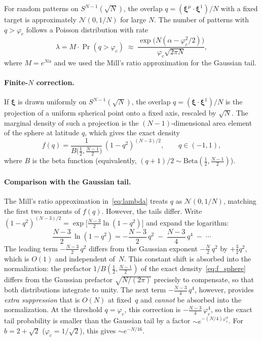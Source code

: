 \documentclass[11pt]{article}
\newcommand{\vp}{\varphi}
\newcommand{\bxi}{\boldsymbol{\xi}}
\begin{document}
For random patterns on $S^{N-1}(\sqrt{N})$, the overlap
$q = (\bxi^\mu \cdot \bxi^1)/N$ with a fixed target is
approximately $\mathcal{N}(0, 1/N)$ for large $N$.
The number of patterns with $q > \vp_c$ follows a Poisson
distribution with rate
\begin{equation}\label{eq:lambda}
  \lambda = M \cdot \Pr(q > \vp_c)
  \;\approx\;
  \frac{\exp\!\bigl(N(\alpha - \vp_c^2/2)\bigr)}
       {\vp_c \sqrt{2\pi N}},
\end{equation}
where $M = e^{N\alpha}$ and we used the Mill's ratio
approximation for the Gaussian tail.

\paragraph{Finite-$N$ correction.}
If $\bxi$ is drawn uniformly on $S^{N-1}(\sqrt{N})$,
the overlap $q = (\bxi \cdot \bxi^1)/N$ is
the projection of a uniform spherical point onto a fixed axis,
rescaled by $\sqrt{N}$.  The marginal density of such a
projection is the $(N{-}1)$-dimensional area element of the
sphere at latitude $q$, which gives the exact density
\begin{equation}\label{eq:f_sphere}
  f(q) = \frac{1}{B\!\bigl(\tfrac{1}{2}, \tfrac{N-1}{2}\bigr)}\,
  (1 - q^2)^{(N-3)/2}, \qquad q \in (-1, 1),
\end{equation}
where $B$ is the beta function
(equivalently, $(q+1)/2 \sim \mathrm{Beta}(\tfrac{1}{2},\tfrac{N-1}{2})$).

\paragraph{Comparison with the Gaussian tail.}
The Mill's ratio approximation in~\eqref{eq:lambda} treats
$q$ as $\mathcal{N}(0, 1/N)$, matching the first two moments of
$f(q)$.  However, the tails differ.  Write
$(1 - q^2)^{(N-3)/2} = \exp\!\bigl[\tfrac{N-3}{2}\ln(1 - q^2)\bigr]$
and expand the logarithm:
\begin{equation}\label{eq:tail_expand}
  \frac{N{-}3}{2}\,\ln(1 - q^2)
  = -\frac{N{-}3}{2}\,q^2
    \;-\;\frac{N{-}3}{4}\,q^4
    \;-\;\cdots
\end{equation}
The leading term $-\frac{N-3}{2}\,q^2$ differs from the
Gaussian exponent $-\frac{N}{2}\,q^2$ by $+\frac{3}{2}q^2$,
which is $O(1)$ and independent of~$N$.
This constant shift is absorbed into the normalization:
the prefactor $1/B(\tfrac{1}{2},\tfrac{N-1}{2})$ of the exact
density~\eqref{eq:f_sphere} differs from the Gaussian prefactor
$\sqrt{N/(2\pi)}$ precisely to compensate, so that both
distributions integrate to unity.
The next term $-\frac{N-3}{4}\,q^4$, however, provides
\emph{extra suppression} that is $O(N)$ at fixed~$q$
and \emph{cannot} be absorbed into the normalization.
At the threshold $q = \vp_c$, this correction is
$-\frac{N-3}{4}\,\vp_c^4$, so the exact
tail probability is smaller than the Gaussian tail by a factor
$\sim e^{-(N/4)\vp_c^4}$.
For $b = 2 + \sqrt{2}$ ($\vp_c = 1/\sqrt{2}$),
this gives $\sim e^{-N/16}$.
\end{document}

